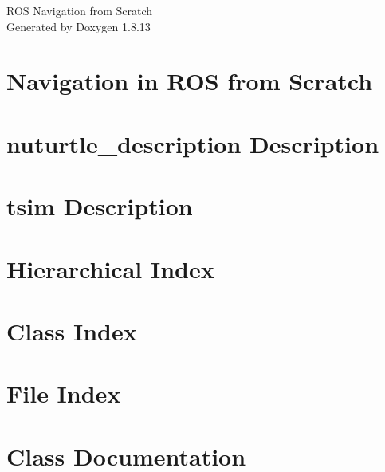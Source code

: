 \documentclass[twoside]{book}
\newcommand{\+}{\discretionary{\mbox{\scriptsize$\hookleftarrow$}}{}{}}
\newcommand{\clearemptydoublepage}{%
  \newpage{\pagestyle{empty}\cleardoublepage}%
}
\begin{document}
\hypersetup{pageanchor=false,
             bookmarksnumbered=true,
             pdfencoding=unicode
            }
\begin{titlepage}
\vspace*{7cm}
\begin{center}%
{\Large R\+OS Navigation from Scratch }\\
\vspace*{1cm}
{\large Generated by Doxygen 1.8.13}\\
\end{center}
\end{titlepage}
\clearemptydoublepage
{}
\tableofcontents
\clearemptydoublepage
{}
\hypersetup{pageanchor=true}

\chapter{Navigation in R\+OS from Scratch}
\label{index}\hypertarget{index}{}
\chapter{nuturtle\+\_\+description Description}
\label{md_nuturtle_description_README}

\chapter{tsim Description}
\label{md_tsim_README}

\chapter{Hierarchical Index}

\chapter{Class Index}

\chapter{File Index}

\chapter{Class Documentation}










\end{document}
